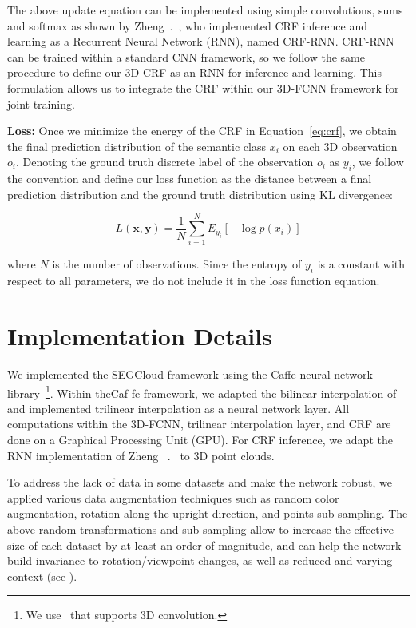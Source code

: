 \documentclass[10pt,twocolumn,letterpaper]{article}
\newcommand{\fccrf}[0]{CRF\xspace}
\newcommand{\ours}[0]{SEGCloud\xspace}
\newcommand{\threedfcnn}[0]{3D-FCNN\xspace}
\begin{document}
The above update equation can be implemented using simple convolutions, sums and softmax as shown by Zheng~\etal.~\cite{Zheng2015}, who implemented CRF inference and learning as a Recurrent Neural Network (RNN), named CRF-RNN. CRF-RNN can be trained within a standard CNN framework, so we follow the same procedure to define our 3D \fccrf as an RNN for inference and learning. This formulation allows us to integrate the \fccrf within our \threedfcnn framework for joint training.

\noindent\textbf{Loss:} \label{sec:loss}
Once we minimize the energy of the \fccrf in Equation~\ref{eq:crf}, we obtain the final prediction distribution of the semantic class $x_i$ on each 3D observation $o_i$. Denoting the ground truth discrete label of the observation $o_i$ as $y_i$, we follow the convention and define our loss function as the distance between a final prediction distribution and the ground truth distribution using KL divergence:

\begin{equation}
    L(\mathbf{x}, \mathbf{y}) = \frac{1}{N} \sum_{i=1}^N E_{y_i}[- \log{p(x_i)}]
\end{equation}

where $N$ is the number of observations. Since the entropy of $y_i$ is a constant with respect to all parameters, we do not include it in the loss function equation. 
\section{Implementation Details} \label{sec:implementation}
We implemented the \ours framework using the Caffe neural network library~\cite{jia2014caffe}\footnote{We use~\cite{video-caffe} that supports 3D convolution.}. Within theCaf fe framework, we adapted the bilinear interpolation of \cite{bilinear} and implemented trilinear interpolation as a neural network layer. All computations within the \threedfcnn, trilinear interpolation layer, and \fccrf are done on a Graphical Processing Unit (GPU). For \fccrf inference, we adapt the RNN implementation of Zheng ~\etal.~\cite{Zheng2015} to 3D point clouds.

To address the lack of data in some datasets and make the network robust, we applied various data augmentation techniques such as random color augmentation, rotation along the upright direction, and points sub-sampling. The above random transformations and sub-sampling allow to increase the effective size of each dataset by at least an order of magnitude, and can help the network build invariance to rotation/viewpoint changes, as well as reduced and varying context (see \cite{segcloudsuppl}).
\end{document}
